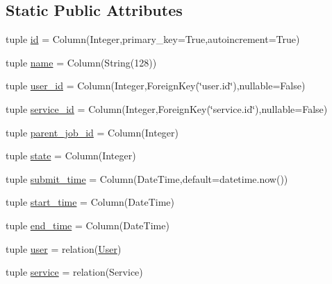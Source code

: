 \subsection*{\-Static \-Public \-Attributes}
\begin{DoxyCompactItemize}
\item 
tuple \hyperlink{classcyberweb_1_1model_1_1job_1_1_job_a98bf1c7292121b428c1273b5ff4db97f}{id} = \-Column(\-Integer,primary\-\_\-key=\-True,autoincrement=\-True)
\item 
tuple \hyperlink{classcyberweb_1_1model_1_1job_1_1_job_a348745d1266dbc6eeb03251e517a7b56}{name} = \-Column(\-String(128))
\item 
tuple \hyperlink{classcyberweb_1_1model_1_1job_1_1_job_abfccdaa55a0e7e65b6c17ea04c221cc7}{user\-\_\-id} = \-Column(\-Integer,\-Foreign\-Key(\char`\"{}user.\-id\char`\"{}),nullable=\-False)
\item 
tuple \hyperlink{classcyberweb_1_1model_1_1job_1_1_job_a3ace0cfb6a70d37312e399161b80a04e}{service\-\_\-id} = \-Column(\-Integer,\-Foreign\-Key(\char`\"{}service.\-id\char`\"{}),nullable=\-False)
\item 
tuple \hyperlink{classcyberweb_1_1model_1_1job_1_1_job_aa3b987b82ebb6960bf63389768d49df9}{parent\-\_\-job\-\_\-id} = \-Column(\-Integer)
\item 
tuple \hyperlink{classcyberweb_1_1model_1_1job_1_1_job_a05db9771009bc26b3aba7a102d3da1e6}{state} = \-Column(\-Integer)
\item 
tuple \hyperlink{classcyberweb_1_1model_1_1job_1_1_job_aea1f925f65afd7d6d3e4f432e66642a6}{submit\-\_\-time} = \-Column(\-Date\-Time,default=datetime.\-now())
\item 
tuple \hyperlink{classcyberweb_1_1model_1_1job_1_1_job_a8321da9488235ad4077bace5538e2ced}{start\-\_\-time} = \-Column(\-Date\-Time)
\item 
tuple \hyperlink{classcyberweb_1_1model_1_1job_1_1_job_acb11812580f3c6ef12c6ca493fa92c62}{end\-\_\-time} = \-Column(\-Date\-Time)
\item 
tuple \hyperlink{classcyberweb_1_1model_1_1job_1_1_job_a4388cc5ef8e159413c45a37d6435c1a8}{user} = relation(\hyperlink{classcyberweb_1_1model_1_1user_1_1_user}{\-User})
\item 
tuple \hyperlink{classcyberweb_1_1model_1_1job_1_1_job_a05f978f19c87a0293f730e6b71a4e74c}{service} = relation(\-Service)
\end{DoxyCompactItemize}


